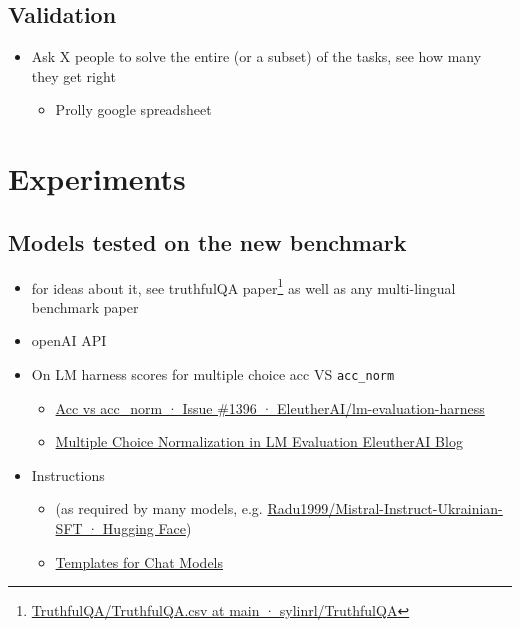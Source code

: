 \section{Validation}\label{validation}

\begin{itemize}
\tightlist
\item
  Ask X people to solve the entire (or a subset) of the tasks, see how
  many they get right

  \begin{itemize}
  \tightlist
  \item
    Prolly google spreadsheet
  \end{itemize}
\end{itemize}

\chapter{Experiments}\label{experiments}

\section{Models tested on the new
benchmark}\label{models-tested-on-the-new-benchmark}

\begin{itemize}
\item
  for ideas about it, see truthfulQA paper\footnote{\href{https://github.com/sylinrl/TruthfulQA/blob/main/TruthfulQA.csv}{TruthfulQA/TruthfulQA.csv
    at main · sylinrl/TruthfulQA}} as well as any multi-lingual
  benchmark paper
\item
  openAI API
\item
  On LM harness scores for multiple choice acc VS \texttt{acc\_norm}

  \begin{itemize}
  \tightlist
  \item
    \href{https://github.com/EleutherAI/lm-evaluation-harness/issues/1396}{Acc
    vs acc\_norm · Issue \#1396 · EleutherAI/lm-evaluation-harness}
  \item
    \href{https://blog.eleuther.ai/multiple-choice-normalization/}{Multiple
    Choice Normalization in LM Evaluation \textbar{} EleutherAI Blog}
  \end{itemize}
\item
  Instructions

  \begin{itemize}
  \tightlist
  \item
    (as required by many models, e.g.
    \href{https://huggingface.co/Radu1999/Mistral-Instruct-Ukrainian-SFT}{Radu1999/Mistral-Instruct-Ukrainian-SFT
    · Hugging Face})
  \item
    \href{https://huggingface.co/docs/transformers/main/chat_templating}{Templates
    for Chat Models}
  \end{itemize}
\end{itemize}

